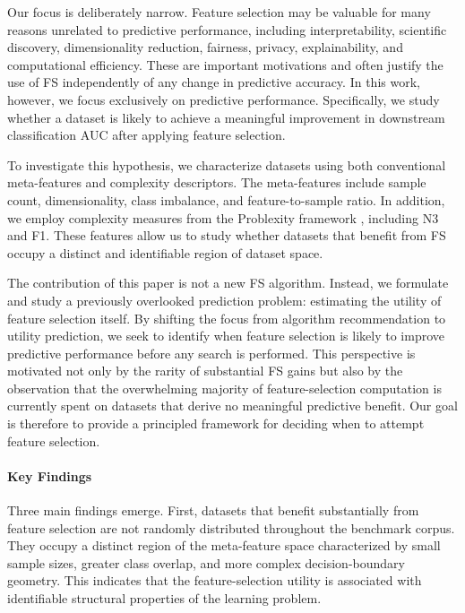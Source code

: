 \documentclass[preprint,12pt,authoryear]{elsarticle}
\begin{document}
Our focus is deliberately narrow. Feature selection may be valuable for many reasons unrelated to predictive performance, including interpretability, scientific discovery, dimensionality reduction, fairness, privacy, explainability, and computational efficiency. These are important motivations and often justify the use of FS independently of any change in predictive accuracy. In this work, however, we focus exclusively on predictive performance. Specifically, we study whether a dataset is likely to achieve a meaningful improvement in downstream classification AUC after applying feature selection.

To investigate this hypothesis, we characterize datasets using both conventional meta-features and complexity descriptors. The meta-features include sample count, dimensionality, class imbalance, and feature-to-sample ratio. In addition, we employ complexity measures from the Problexity framework \citep{Komorniczak2023Problexity}, including N3 and F1. These features allow us to study whether datasets that benefit from FS occupy a distinct and identifiable region of dataset space.

The contribution of this paper is not a new FS algorithm. Instead, we formulate and study a previously overlooked prediction problem: estimating the utility of feature selection itself. By shifting the focus from algorithm recommendation to utility prediction, we seek to identify when feature selection is likely to improve predictive performance before any search is performed. This perspective is motivated not only by the rarity of substantial FS gains but also by the observation that the overwhelming majority of feature-selection computation is currently spent on datasets that derive no meaningful predictive benefit. Our goal is therefore to provide a principled framework for deciding when to attempt feature selection.

\paragraph{Key Findings}
Three main findings emerge. First, datasets that benefit substantially from feature selection are not randomly distributed throughout the benchmark corpus. They occupy a distinct region of the meta-feature space characterized by small sample sizes, greater class overlap, and more complex decision-boundary geometry. This indicates that the feature-selection utility is associated with identifiable structural properties of the learning problem.
\end{document}
